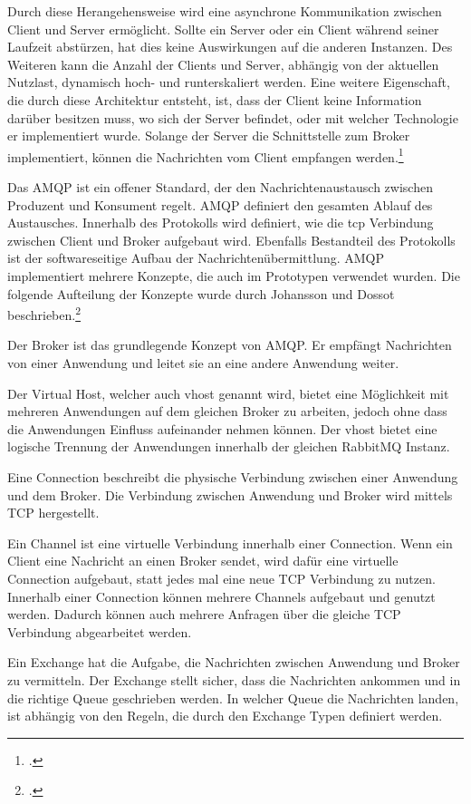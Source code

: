 Durch diese Herangehensweise wird eine asynchrone Kommunikation zwischen Client und Server ermöglicht. Sollte ein Server oder ein Client während seiner Laufzeit abstürzen, hat dies keine Auswirkungen auf die anderen Instanzen. Des Weiteren kann die Anzahl der Clients und Server, abhängig von der aktuellen Nutzlast, dynamisch hoch- und runterskaliert werden. Eine weitere Eigenschaft, die durch diese Architektur entsteht, ist, dass der Client keine Information darüber besitzen muss, wo sich der Server befindet, oder mit welcher Technologie er implementiert wurde. Solange der Server die Schnittstelle zum Broker implementiert, können die Nachrichten vom Client empfangen werden.\footcite{dossot2014rabbitmq}

Das AMQP ist ein offener Standard, der den Nachrichtenaustausch zwischen Produzent und Konsument regelt. AMQP definiert den gesamten Ablauf des Austausches. Innerhalb des Protokolls wird definiert, wie die \ac{tcp} Verbindung zwischen Client und Broker aufgebaut wird. Ebenfalls Bestandteil des Protokolls ist der softwareseitige Aufbau der Nachrichtenübermittlung. AMQP implementiert mehrere Konzepte, die auch im Prototypen verwendet wurden. Die folgende Aufteilung der Konzepte wurde durch Johansson und Dossot beschrieben.\footcite{JohanssonLovisa2020REBD}

Der Broker ist das grundlegende Konzept von AMQP. Er empfängt Nachrichten von einer Anwendung und leitet sie an eine andere Anwendung weiter.

Der Virtual Host, welcher auch vhost genannt wird, bietet eine Möglichkeit mit mehreren Anwendungen auf dem gleichen Broker zu arbeiten, jedoch ohne dass die Anwendungen Einfluss aufeinander nehmen können. Der vhost bietet eine logische Trennung der Anwendungen innerhalb der gleichen RabbitMQ Instanz.

Eine Connection beschreibt die physische Verbindung zwischen einer Anwendung und dem Broker. Die Verbindung zwischen Anwendung und Broker wird mittels TCP hergestellt. 

Ein Channel ist eine virtuelle Verbindung innerhalb einer Connection. Wenn ein Client eine Nachricht an einen Broker sendet, wird dafür eine virtuelle Connection aufgebaut, statt jedes mal eine neue TCP Verbindung zu nutzen. Innerhalb einer Connection können mehrere Channels aufgebaut und genutzt werden. Dadurch können auch mehrere Anfragen über die gleiche TCP Verbindung abgearbeitet werden. 

Ein Exchange hat die Aufgabe, die Nachrichten zwischen Anwendung und Broker zu vermitteln. Der Exchange stellt sicher, dass die Nachrichten ankommen und in die richtige Queue geschrieben werden. In welcher Queue die Nachrichten landen, ist abhängig von den Regeln, die durch den Exchange Typen definiert werden.  

